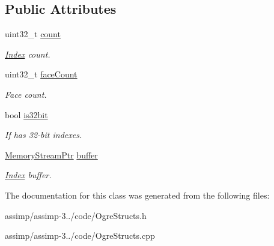\subsection*{Public Attributes}
\begin{DoxyCompactItemize}
\item 
\hypertarget{class_assimp_1_1_ogre_1_1_index_data_a41b8420626452a3f3c83c2d91acdb223}{uint32\+\_\+t \hyperlink{class_assimp_1_1_ogre_1_1_index_data_a41b8420626452a3f3c83c2d91acdb223}{count}}\label{class_assimp_1_1_ogre_1_1_index_data_a41b8420626452a3f3c83c2d91acdb223}

\begin{DoxyCompactList}\small\item\em \hyperlink{struct_index}{Index} count. \end{DoxyCompactList}\item 
\hypertarget{class_assimp_1_1_ogre_1_1_index_data_a077c9f258c3f3246fcba05e2bd5648e8}{uint32\+\_\+t \hyperlink{class_assimp_1_1_ogre_1_1_index_data_a077c9f258c3f3246fcba05e2bd5648e8}{face\+Count}}\label{class_assimp_1_1_ogre_1_1_index_data_a077c9f258c3f3246fcba05e2bd5648e8}

\begin{DoxyCompactList}\small\item\em Face count. \end{DoxyCompactList}\item 
\hypertarget{class_assimp_1_1_ogre_1_1_index_data_aabd12682d760579520e2c0ac3671efe1}{bool \hyperlink{class_assimp_1_1_ogre_1_1_index_data_aabd12682d760579520e2c0ac3671efe1}{is32bit}}\label{class_assimp_1_1_ogre_1_1_index_data_aabd12682d760579520e2c0ac3671efe1}

\begin{DoxyCompactList}\small\item\em If has 32-\/bit indexes. \end{DoxyCompactList}\item 
\hypertarget{class_assimp_1_1_ogre_1_1_index_data_aee25b0a403569c4e174f7e94624f1095}{\hyperlink{classboost_1_1shared__ptr}{Memory\+Stream\+Ptr} \hyperlink{class_assimp_1_1_ogre_1_1_index_data_aee25b0a403569c4e174f7e94624f1095}{buffer}}\label{class_assimp_1_1_ogre_1_1_index_data_aee25b0a403569c4e174f7e94624f1095}

\begin{DoxyCompactList}\small\item\em \hyperlink{struct_index}{Index} buffer. \end{DoxyCompactList}\end{DoxyCompactItemize}


The documentation for this class was generated from the following files\+:\begin{DoxyCompactItemize}
\item 
assimp/assimp-\/3../code/Ogre\+Structs.\+h\item 
assimp/assimp-\/3../code/Ogre\+Structs.\+cpp\end{DoxyCompactItemize}
